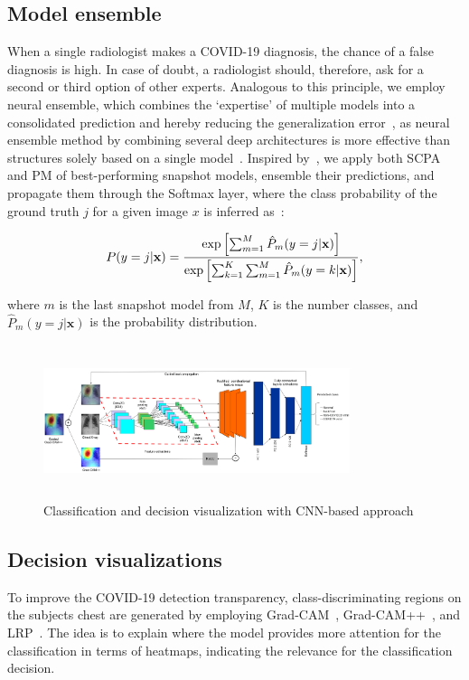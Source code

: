 \documentclass[conference]{IEEEtran}
\begin{document}
\subsection{Model ensemble}
When a single radiologist makes a COVID-19 diagnosis, the chance of a false diagnosis is high. In case of doubt, a radiologist should, therefore, ask for a second or third option of other experts. Analogous to this principle, we employ neural ensemble, which combines the `expertise' of multiple models into a consolidated prediction and hereby reducing the generalization error~\cite{huang2017snapshot}, as neural ensemble method by combining several deep architectures is more effective than structures solely based on a single model~\cite{huang2017snapshot,karim2019snapshot}. 
Inspired by~\cite{7}, we apply both SCPA and PM of best-performing snapshot models, ensemble their predictions, and propagate them through the Softmax layer, where the class probability of the ground truth $j$ for a given image $x$ is inferred as~\cite{7}:

\vspace{-2mm}
\begin{equation}
\scriptsize{
    P(y=j | \mathbf{x})=\frac{\exp \left[\sum_{m=1}^{M} \hat{P}_{m}(y=j | \mathbf{x})\right]}{\exp \left[\sum_{k=1}^{K} \sum_{m=1}^{M} \hat{P}_{m}(y=k | \mathbf{x})\right]},}
\end{equation}

where $m$ is the last snapshot model from $M$, $K$ is the number classes, and $\hat{P}_{m}(y=j | \mathbf{x})$ is the probability distribution. 

\begin{figure}
	\centering
	\includegraphics[width=0.8\textwidth,height=45mm]{gcam_wf.png}
    \caption{Classification and decision visualization with CNN-based approach}	
	\label{fig:viz}
	\vspace{-2mm}
\end{figure}

\subsection{Decision visualizations}
To improve the COVID-19 detection transparency, class-discriminating regions on the subjects chest are generated by employing Grad-CAM~\cite{114}, Grad-CAM++~\cite{chattopadhay2018grad}, and LRP~\cite{LRP2}. The idea is to explain where the model provides more attention for the classification in terms of heatmaps, 
indicating the relevance for the classification decision.
\end{document}
